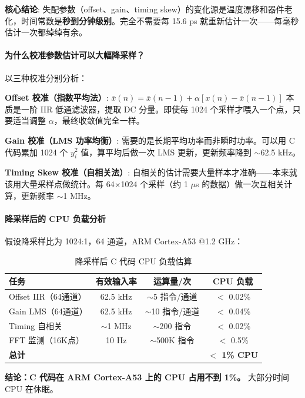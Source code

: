 \documentclass[UTF8,a4paper,11pt]{ctexart}
\begin{document}
\textbf{核心结论}: 失配参数（offset、gain、timing skew）的变化源是温度漂移和器件老化，时间常数是\textbf{秒到分钟级别}。完全不需要每 15.6 ps 就重新估计一次——每毫秒估计一次都绰绰有余。

\paragraph{为什么校准参数估计可以大幅降采样？}

以三种校准分别分析：

\textbf{Offset 校准（指数平均法）}: $\bar{x}(n) = \bar{x}(n-1) + \alpha [x(n) - \bar{x}(n-1)]$ 本质是一阶 IIR 低通滤波器，提取 DC 分量。即使每 1024 个采样才喂入一个点，只要适当调整 $\alpha$，最终收敛值完全一样。

\textbf{Gain 校准（LMS 功率均衡）}: 需要的是长期平均功率而非瞬时功率。可以用 C 代码累加 1024 个 $y_i^2$ 值，算平均后做一次 LMS 更新，更新频率降到 $\sim$62.5 kHz。

\textbf{Timing Skew 校准（自相关法）}: 自相关的估计需要大量样本才准确——本来就该用大量采样点做统计。每 64$\times$1024 个采样（约 1 $\mu$s 的数据）做一次互相关计算，更新频率 $\sim$1 MHz。

\paragraph{降采样后的 CPU 负载分析}

假设降采样比为 1024:1，64 通道，ARM Cortex-A53 @1.2 GHz：

\begin{table}[ht]
\centering
\caption{降采样后 C 代码 CPU 负载估算}
\begin{tabular}{lccc}
\toprule
\textbf{任务} & \textbf{有效输入率} & \textbf{运算量/次} & \textbf{CPU 负载} \\
\midrule
Offset IIR（64通道） & 62.5 kHz & $\sim$5 指令/通道 & $<$ 0.02\% \\
Gain LMS（64通道） & 62.5 kHz & $\sim$10 指令/通道 & $<$ 0.04\% \\
Timing 自相关 & $\sim$1 MHz & $\sim$200 指令 & $<$ 0.02\% \\
FFT 监测（16K点） & 10 Hz & $\sim$500K 指令 & $<$ 0.5\% \\
\midrule
\textbf{总计} & & & \textbf{$<$ 1\% CPU} \\
\bottomrule
\end{tabular}
\end{table}

\textbf{结论：C 代码在 ARM Cortex-A53 上的 CPU 占用不到 1\%。} 大部分时间 CPU 在休眠。
\end{document}

